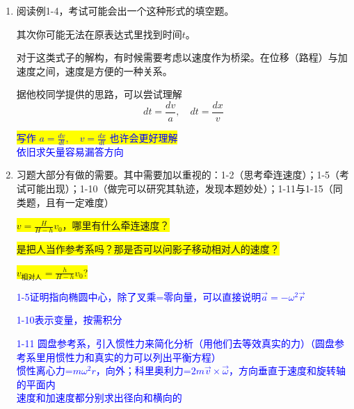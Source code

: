 \documentclass[12pt,a4paper]{article}
\begin{document}
\begin{enumerate}[label=\arabic*.,leftmargin=*]
    \item 阅读例1-4，考试可能会出一个这种形式的填空题。
    
    其次你可能无法在原表达式里找到时间$t$。
    
    对于这类式子的解构，有时候需要考虑以速度作为桥梁。在位移（路程）与加速度之间，速度是方便的一种关系。
    
    据他校同学提供的思路，可以尝试理解
    \[
    dt=\frac{dv}{a},\quad dt=\frac{dx}{v}
    \]

    \textcolor{blue}{
        \colorbox{yellow}{
        写作
    $a=\frac{dv}{dt},\quad v=\frac{dx}{dt}$
    也许会更好理解}\\
    依旧求矢量容易漏答方向}

    \item 习题大部分有做的需要。其中需要加以重视的：1-2（思考牵连速度）；1-5（考试可能出现）；1-10（做完可以研究其轨迹，发现本题妙处）；1-11与1-15（同类题，且有一定难度）
    
    \colorbox{yellow}{$v=\frac{H}{H-h}v_0$，哪里有什么牵连速度？}

    \colorbox{yellow}{是把人当作参考系吗？那是否可以问影子移动相对人的速度？}

    \colorbox{yellow}{$v_{\text{相对人}}=\frac{h}{H-h}v_0$?}
    
    \textcolor{blue}{1-5证明指向椭圆中心，除了叉乘=零向量，可以直接说明$\vec{a}=-\omega^2\vec{r}$}

    \textcolor{blue}{1-10表示变量，按需积分}

    \textcolor{blue}{1-11 圆盘参考系，引入惯性力来简化分析（用他们去等效真实的力）（圆盘参考系里用惯性力和真实的力可以列出平衡方程）\\
    惯性离心力=$m\omega^2 r$，向外；科里奥利力=$2m\vec{v}\times\vec{\omega} $，方向垂直于速度和旋转轴的平面内\\
    速度和加速度都分别求出径向和横向的\\
    }
\end{enumerate}
\end{document}
